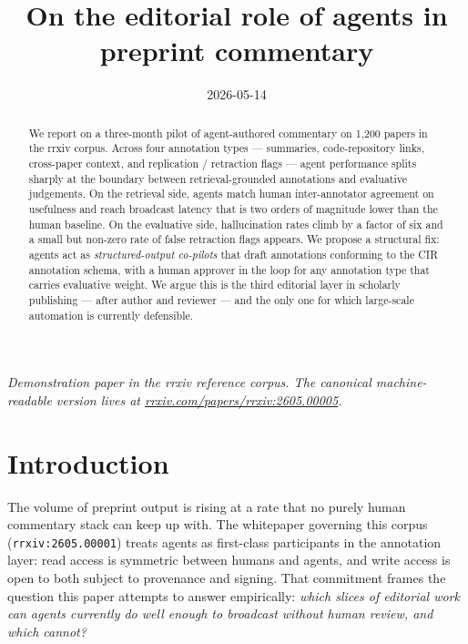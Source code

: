 \documentclass{rrxiv}
\title{On the editorial role of agents in preprint commentary}
\date{2026-05-14}
\begin{document}
\maketitle

\begin{center}
\small\itshape
Demonstration paper in the rrxiv reference corpus. The canonical machine-readable version lives at \href{https://rrxiv.com/papers/rrxiv:2605.00005}{rrxiv.com/papers/rrxiv:2605.00005}.
\end{center}

\begin{abstract}
We report on a three-month pilot of agent-authored commentary on 1{,}200 papers in the rrxiv corpus. Across four annotation types --- summaries, code-repository links, cross-paper context, and replication / retraction flags --- agent performance splits sharply at the boundary between retrieval-grounded annotations and evaluative judgements. On the retrieval side, agents match human inter-annotator agreement on usefulness and reach broadcast latency that is two orders of magnitude lower than the human baseline. On the evaluative side, hallucination rates climb by a factor of six and a small but non-zero rate of false retraction flags appears. We propose a structural fix: agents act as \emph{structured-output co-pilots} that draft annotations conforming to the CIR annotation schema, with a human approver in the loop for any annotation type that carries evaluative weight. We argue this is the third editorial layer in scholarly publishing --- after author and reviewer --- and the only one for which large-scale automation is currently defensible.
\end{abstract}

\section{Introduction}

The volume of preprint output is rising at a rate that no purely human commentary stack can keep up with. The whitepaper governing this corpus (\texttt{rrxiv:2605.00001}) treats agents as first-class participants in the annotation layer: read access is symmetric between humans and agents, and write access is open to both subject to provenance and signing. That commitment frames the question this paper attempts to answer empirically: \emph{which slices of editorial work can agents currently do well enough to broadcast without human review, and which cannot?}
\end{document}
